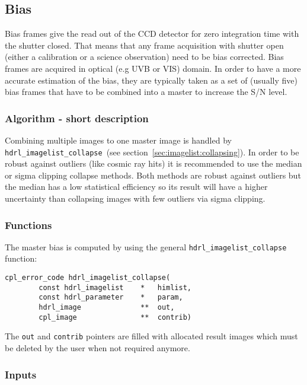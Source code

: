 \subsection{Bias}
\label{sec:algorithms:bias:main}

Bias frames give the read out of the CCD detector for zero integration 
time with the shutter closed. That means that any frame acquisition
with shutter open (either a calibration or a science observation) need
to be bias corrected. Bias frames are acquired in optical (e.g UVB or
VIS) domain.
In order to have a more accurate estimation of the bias, they are typically
taken as a set of (usually five) bias frames that have to be combined into
a master to increase the S/N level.

\subsubsection{Algorithm - short description}
\label{sec:algorithms:bias:algo}

Combining multiple images to one master image is handled by
\verb+hdrl_imagelist_collapse+~(see
section~\ref{sec:imagelist:collapsing}).  In order to be robust
against outliers (like cosmic ray hits) it is recommended to use the
median or sigma clipping collapse methods. Both methods are robust
against outliers but the median has a low statistical efficiency so
its result will have a higher uncertainty than collapsing images with
few outliers via sigma clipping.

\subsubsection{Functions}
\label{sec:algorithms:bias:functions}

The master bias is computed by using the general
\verb+hdrl_imagelist_collapse+ function:

\begin{lstlisting}
cpl_error_code hdrl_imagelist_collapse(
        const hdrl_imagelist    *   himlist,
        const hdrl_parameter    *   param,
        hdrl_image              **  out,
        cpl_image               **  contrib)
\end{lstlisting}
The \verb+out+ and \verb+contrib+ pointers are filled with allocated
result images which must be deleted by the user when not required
anymore.

\subsubsection{Inputs}
\label{sec:algorithms:bias:inputs}

